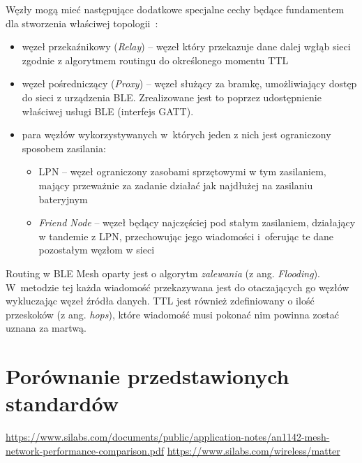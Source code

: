 Węzły mogą mieć następujące dodatkowe specjalne cechy będące fundamentem dla stworzenia właściwej topologii~\cite{woolley_bluetooth_2020, st_an5292_2021}:
\begin{itemize}
\item węzeł przekaźnikowy (\textit{Relay}) -- węzeł który przekazuje dane dalej wgłąb sieci zgodnie z algorytmem routingu do określonego momentu \gls{TTL}
\item węzeł pośredniczący (\textit{Proxy}) -- węzeł służący za bramkę, umożliwiający dostęp do sieci z urządzenia BLE. Zrealizowane jest to poprzez
udostępnienie właściwej usługi BLE (interfejs GATT).
\item para węzłów wykorzystywanych w~których jeden z nich jest ograniczony sposobem zasilania:
	\begin{itemize}
	\item \gls{LPN} -- węzeł ograniczony zasobami sprzętowymi w tym zasilaniem, mający przeważnie za zadanie działać jak najdłużej na zasilaniu bateryjnym
	\item \textit{Friend Node} -- węzeł będący najczęściej pod stałym zasilaniem, działający w tandemie z \gls{LPN}, przechowując jego wiadomości
	i~oferując te dane pozostałym węzłom w sieci
	\end{itemize}
\end{itemize}

Routing w BLE Mesh oparty jest o algorytm \textit{zalewania} (z ang. \textit{Flooding}). W~metodzie tej każda wiadomość przekazywana
jest do otaczających go węzłów wykluczając węzeł źródła danych. \gls{TTL} jest również zdefiniowany o ilość przeskoków (z ang. \textit{hops}),
które wiadomość musi pokonać nim powinna zostać uznana za martwą.


\section{Porównanie przedstawionych standardów} %
\url{https://www.silabs.com/documents/public/application-notes/an1142-mesh-network-performance-comparison.pdf}
\url{https://www.silabs.com/wireless/matter}
\lipsum[1-15]


